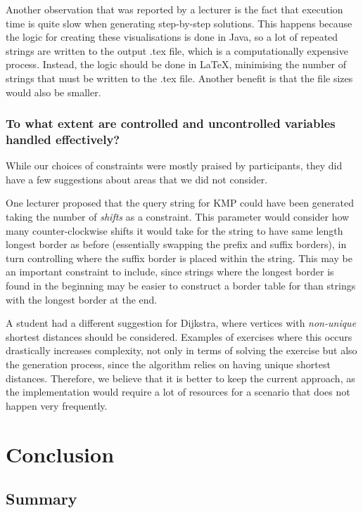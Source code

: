 \documentclass{l4proj}
\begin{document}
Another observation that was reported by a lecturer is the fact that execution time is quite slow when generating step-by-step solutions. This happens because the logic for creating these visualisations is done in Java, so a lot of repeated strings are written to the output .tex file, which is a computationally expensive process. Instead, the logic should be done in LaTeX, minimising the number of strings that must be written to the .tex file. Another benefit is that the file sizes would also be smaller.

\subsection*{To what extent are controlled and uncontrolled variables handled effectively?}

While our choices of constraints were mostly praised by participants, they did have a few suggestions about areas that we did not consider.

One lecturer proposed that the query string for KMP could have been generated taking the number of \emph{shifts} as a constraint. This parameter would consider how many counter-clockwise shifts it would take for the string to have same length longest border as before (essentially swapping the prefix and suffix borders), in turn controlling where the suffix border is placed within the string. This may be an important constraint to include, since strings where the longest border is found in the beginning may be easier to construct a border table for than strings with the longest border at the end.

A student had a different suggestion for Dijkstra, where vertices with \emph{non-unique} shortest distances should be considered. Examples of exercises where this occurs drastically increases complexity, not only in terms of solving the exercise but also the generation process, since the algorithm relies on having unique shortest distances. Therefore, we believe that it is better to keep the current approach, as the implementation would require a lot of resources for a scenario that does not happen very frequently.

\chapter{Conclusion}    
\label{chap:conc}
\section{Summary}
\end{document}
